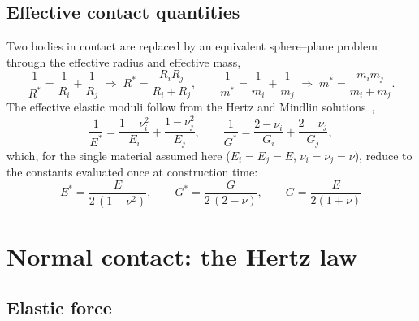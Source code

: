 \subsection{Effective contact quantities}

Two bodies in contact are replaced by an equivalent sphere--plane problem
through the effective radius and effective mass,
\begin{equation}
  \frac{1}{R^{*}} = \frac{1}{R_{i}} + \frac{1}{R_{j}}
  \;\Longrightarrow\;
  R^{*}=\frac{R_{i}R_{j}}{R_{i}+R_{j}},
  \qquad
  \frac{1}{m^{*}} = \frac{1}{m_{i}} + \frac{1}{m_{j}}
  \;\Longrightarrow\;
  m^{*}=\frac{m_{i}m_{j}}{m_{i}+m_{j}} .
  \label{eq:effective}
\end{equation}
The effective elastic moduli follow from the Hertz and Mindlin
solutions~\cite{johnson1985},
\begin{equation}
  \frac{1}{E^{*}} = \frac{1-\nu_{i}^{2}}{E_{i}} + \frac{1-\nu_{j}^{2}}{E_{j}},
  \qquad
  \frac{1}{G^{*}} = \frac{2-\nu_{i}}{G_{i}} + \frac{2-\nu_{j}}{G_{j}} ,
  \label{eq:moduli-general}
\end{equation}
which, for the single material assumed here ($E_{i}=E_{j}=E$,
$\nu_{i}=\nu_{j}=\nu$), reduce to the constants evaluated once at
construction time:
\begin{equation}
  \boxed{\;
  E^{*} = \frac{E}{2\,(1-\nu^{2})},
  \qquad
  G^{*} = \frac{G}{2\,(2-\nu)},
  \qquad
  G = \frac{E}{2(1+\nu)} \;}
  \label{eq:moduli}
\end{equation}

\section{Normal contact: the Hertz law}
\label{sec:normal}

\subsection{Elastic force}

